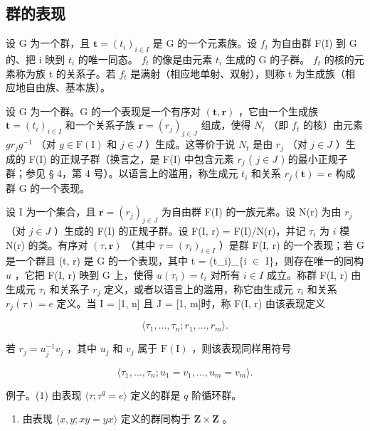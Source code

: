 \subsection{群的表现}

设 G 为一个群，且 \(\mathbf{t} = (t_{i})_{i \in I}\) 是 G 的一个元素族。设 \(f_{t}\) 为自由群 F(I) 到 G 的、把 i 映到 \(t_{i}\) 的唯一同态。 \(f_{t}\) 的像是由元素 \(t_{i}\) 生成的 G 的子群。 \(f_{t}\) 的核的元素称为族 t 的关系子。若 \(f_{t}\) 是满射（相应地单射、双射），则称 t 为生成族（相应地自由族、基本族）。

设 G 为一个群。G 的一个表现是一个有序对 \((\mathbf{t}, \mathbf{r})\) ，它由一个生成族 \(\mathbf{t} = (t_{i})_{i \in I}\) 和一个关系子族 \(\mathbf{r} = (r_{j})_{j \in J}\) 组成，使得 \(N_{t}\) （即 \(f_{t}\) 的核）由元素 \(gr_{j}g^{-1}\) （对 \(g \in \mathrm{F}(\mathrm{I})\) 和 \(j \in J\) ）生成。这等价于说 \(N_{t}\) 是由 \(r_{j}\) （对 \(j \in J\) ）生成的 F(I) 的正规子群（换言之，是 F(I) 中包含元素 \(r_{j}\) ( \(j \in J\) ) 的最小正规子群；参见 § 4，第 4 号）。以语言上的滥用，称生成元 \(t_{i}\) 和关系 \(r_{j}(\mathbf{t}) = e\) 构成群 G 的一个表现。

设 I 为一个集合，且 \(\mathbf{r} = (r_j)_{j \ensuremath{\in} J}\) 为自由群 F(I) 的一族元素。设 N(r) 为由 \(r_j\) （对 \(j \ensuremath{\in} J\) ）生成的 F(I) 的正规子群。设 F(I, r) = F(I)/N(r)，并记 \(\tau_i\) 为 \(i\) 模 N(r) 的类。有序对 \((\tau, \mathbf{r})\) （其中 \(\tau = (\tau_i)_{i \ensuremath{\in} I}\) ）是群 F(I, r) 的一个表现；若 G 是一个群且 (t, r) 是 G 的一个表现，其中 t = (t\_i)\_\{i \ensuremath{\in} I\}，则存在唯一的同构 \(u\) ，它把 F(I, r) 映到 G 上，使得 \(u(\tau_i) = t_i\) 对所有 \(i \ensuremath{\in} I\) 成立。称群 F(I, r) 由生成元 \(\tau_i\) 和关系子 \(r_j\) 定义，或者以语言上的滥用，称它由生成元 \(\tau_i\) 和关系 \(r_j(\tau) = e\) 定义。当 I = {[}1, n{]} 且 J = {[}1, m{]}时，称 F(I, r) 由该表现定义

\[
\langle \tau_ {1}, \dots , \tau_ {n}; r _ {1}, \dots , r _ {m} \rangle .
\]

若 \(r_j = u_j^{-1}v_j\) ，其中 \(u_j\) 和 \(v_j\) 属于 \(\mathrm{F(I)}\) ，则该表现同样用符号

\[
\langle \tau_ {1}, \dots , \tau_ {n}; u _ {1} = v _ {1}, \dots , u _ {m} = v _ {m} \rangle .
\]

例子。(1) 由表现 \(\langle \tau; \tau^q = e \rangle\) 定义的群是 \(q\) 阶循环群。

\begin{enumerate}
\def\labelenumi{(\arabic{enumi})}
\setcounter{enumi}{1}
\tightlist
\item
  由表现 \(\langle x, y; xy = yx \rangle\) 定义的群同构于 \(\mathbf{Z} \times \mathbf{Z}\) 。
\end{enumerate}

